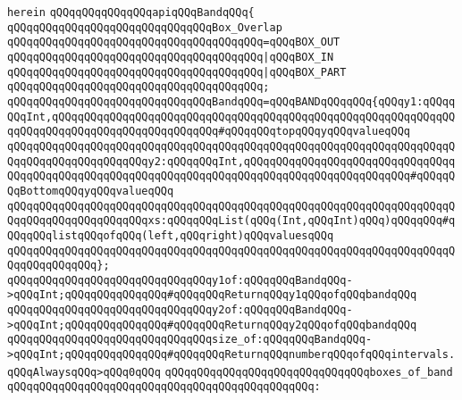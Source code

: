 \verb|herein|\newline
\newline
\verb|qQQqqQQqqQQqqQQqapiqQQqBandqQQq{|\newline
\newline
\verb|qQQqqQQqqQQqqQQqqQQqqQQqqQQqqQQqBox_Overlap|\newline
\verb|qQQqqQQqqQQqqQQqqQQqqQQqqQQqqQQqqQQqqQQq=qQQqBOX_OUT|\newline
\verb|qQQqqQQqqQQqqQQqqQQqqQQqqQQqqQQqqQQqqQQq|\verb#|qQQqBOX_IN#\newline
\verb|qQQqqQQqqQQqqQQqqQQqqQQqqQQqqQQqqQQqqQQq|\verb#|qQQqBOX_PART#\newline
\verb|qQQqqQQqqQQqqQQqqQQqqQQqqQQqqQQqqQQqqQQq;|\newline
\newline
\verb|qQQqqQQqqQQqqQQqqQQqqQQqqQQqqQQqBandqQQq=qQQqBANDqQQqqQQq{qQQqy1:qQQqqQQqInt,qQQqqQQqqQQqqQQqqQQqqQQqqQQqqQQqqQQqqQQqqQQqqQQqqQQqqQQqqQQqqQQqqQQqqQQqqQQqqQQqqQQqqQQqqQQqqQQq#qQQqqQQqtopqQQqyqQQqvalueqQQq|\newline
\verb|qQQqqQQqqQQqqQQqqQQqqQQqqQQqqQQqqQQqqQQqqQQqqQQqqQQqqQQqqQQqqQQqqQQqqQQqqQQqqQQqqQQqqQQqqQQqy2:qQQqqQQqInt,qQQqqQQqqQQqqQQqqQQqqQQqqQQqqQQqqQQqqQQqqQQqqQQqqQQqqQQqqQQqqQQqqQQqqQQqqQQqqQQqqQQqqQQqqQQqqQQq#qQQqqQQqBottomqQQqyqQQqvalueqQQq|\newline
\verb|qQQqqQQqqQQqqQQqqQQqqQQqqQQqqQQqqQQqqQQqqQQqqQQqqQQqqQQqqQQqqQQqqQQqqQQqqQQqqQQqqQQqqQQqqQQqxs:qQQqqQQqList(qQQq(Int,qQQqInt)qQQq)qQQqqQQq#qQQqqQQqlistqQQqofqQQq(left,qQQqright)qQQqvaluesqQQq|\newline
\verb|qQQqqQQqqQQqqQQqqQQqqQQqqQQqqQQqqQQqqQQqqQQqqQQqqQQqqQQqqQQqqQQqqQQqqQQqqQQqqQQqqQQq};|\newline
\newline
\verb|qQQqqQQqqQQqqQQqqQQqqQQqqQQqqQQqy1of:qQQqqQQqBandqQQq->qQQqInt;qQQqqQQqqQQqqQQq#qQQqqQQqReturnqQQqy1qQQqofqQQqbandqQQq|\newline
\verb|qQQqqQQqqQQqqQQqqQQqqQQqqQQqqQQqy2of:qQQqqQQqBandqQQq->qQQqInt;qQQqqQQqqQQqqQQq#qQQqqQQqReturnqQQqy2qQQqofqQQqbandqQQq|\newline
\newline
\verb|qQQqqQQqqQQqqQQqqQQqqQQqqQQqqQQqsize_of:qQQqqQQqBandqQQq->qQQqInt;qQQqqQQqqQQqqQQq#qQQqqQQqReturnqQQqnumberqQQqofqQQqintervals.qQQqAlwaysqQQq>qQQq0qQQq|\newline
\newline
\verb|qQQqqQQqqQQqqQQqqQQqqQQqqQQqqQQqboxes_of_band|\newline
\verb|qQQqqQQqqQQqqQQqqQQqqQQqqQQqqQQqqQQqqQQqqQQqqQQq:|\newline
